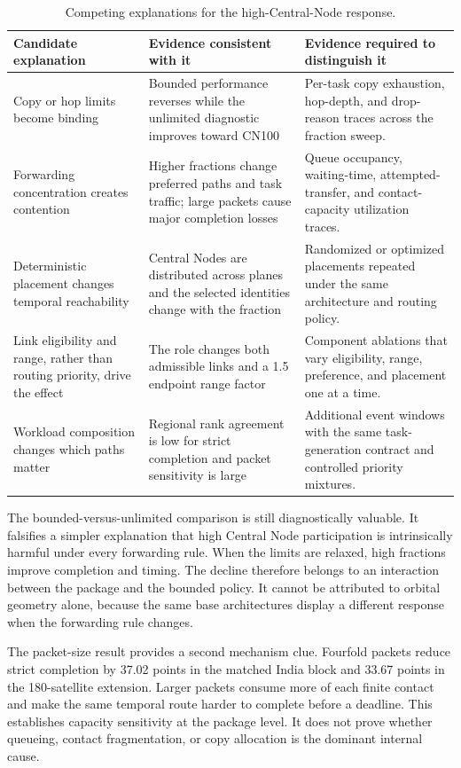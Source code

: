 \begin{table}[htbp]
\centering
\scriptsize
\caption{Competing explanations for the high-Central-Node response.}
\label{tab:mechanism_hypotheses}
\begin{tabularx}{\textwidth}{L{0.22\textwidth}L{0.34\textwidth}Y}
\toprule
Candidate explanation & Evidence consistent with it & Evidence required to distinguish it \\
\midrule
Copy or hop limits become binding & Bounded performance reverses while the unlimited diagnostic improves toward CN100 & Per-task copy exhaustion, hop-depth, and drop-reason traces across the fraction sweep. \\
Forwarding concentration creates contention & Higher fractions change preferred paths and task traffic; large packets cause major completion losses & Queue occupancy, waiting-time, attempted-transfer, and contact-capacity utilization traces. \\
Deterministic placement changes temporal reachability & Central Nodes are distributed across planes and the selected identities change with the fraction & Randomized or optimized placements repeated under the same architecture and routing policy. \\
Link eligibility and range, rather than routing priority, drive the effect & The role changes both admissible links and a 1.5 endpoint range factor & Component ablations that vary eligibility, range, preference, and placement one at a time. \\
Workload composition changes which paths matter & Regional rank agreement is low for strict completion and packet sensitivity is large & Additional event windows with the same task-generation contract and controlled priority mixtures. \\
\bottomrule
\end{tabularx}
\end{table}

The bounded-versus-unlimited comparison is still diagnostically valuable. It falsifies a simpler explanation that high Central Node participation is intrinsically harmful under every forwarding rule. When the limits are relaxed, high fractions improve completion and timing. The decline therefore belongs to an interaction between the package and the bounded policy. It cannot be attributed to orbital geometry alone, because the same base architectures display a different response when the forwarding rule changes.

The packet-size result provides a second mechanism clue. Fourfold packets reduce strict completion by 37.02 points in the matched India block and 33.67 points in the 180-satellite extension. Larger packets consume more of each finite contact and make the same temporal route harder to complete before a deadline. This establishes capacity sensitivity at the package level. It does not prove whether queueing, contact fragmentation, or copy allocation is the dominant internal cause.

